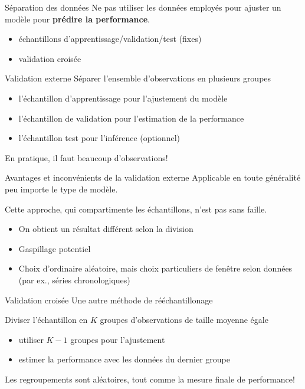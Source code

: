 \documentclass[
  ignorenonframetext,
]{beamer}
\providecommand{\tightlist}{%
  \setlength{\itemsep}{0pt}\setlength{\parskip}{0pt}}\usepackage{longtable,booktabs,array}
\begin{document}
\begin{frame}{Séparation des données}
\protect\hypertarget{suxe9paration-des-donnuxe9es}{}
Ne pas utiliser les données employés pour ajuster un modèle pour
\textbf{prédire la performance}.

\begin{itemize}
\tightlist
\item
  échantillons d'apprentissage/validation/test (fixes)
\item
  validation croisée
\end{itemize}
\end{frame}

\begin{frame}{Validation externe}
\protect\hypertarget{validation-externe}{}
Séparer l'ensemble d'observations en plusieurs groupes

\begin{itemize}
\tightlist
\item
  l'échantillon d'apprentissage pour l'ajustement du modèle
\item
  l'échantillon de validation pour l'estimation de la performance
\item
  l'échantillon test pour l'inférence (optionnel)
\end{itemize}

En pratique, il faut beaucoup d'observations!
\end{frame}

\begin{frame}{Avantages et inconvénients de la validation externe}
\protect\hypertarget{avantages-et-inconvuxe9nients-de-la-validation-externe}{}
Applicable en toute généralité peu importe le type de modèle.

Cette approche, qui compartimente les échantillons, n'est pas sans
faille.

\begin{itemize}
\tightlist
\item
  On obtient un résultat différent selon la division
\item
  Gaspillage potentiel
\item
  Choix d'ordinaire aléatoire, mais choix particuliers de fenêtre selon
  données (par ex., séries chronologiques)
\end{itemize}
\end{frame}

\begin{frame}{Validation croisée}
\protect\hypertarget{validation-croisuxe9e}{}
Une autre méthode de rééchantillonage

Diviser l'échantillon en \(K\) groupes d'observations de taille moyenne
égale

\begin{itemize}
\tightlist
\item
  utiliser \(K-1\) groupes pour l'ajustement
\item
  estimer la performance avec les données du dernier groupe
\end{itemize}

Les regroupements sont aléatoires, tout comme la mesure finale de
performance!
\end{frame}
\end{document}
